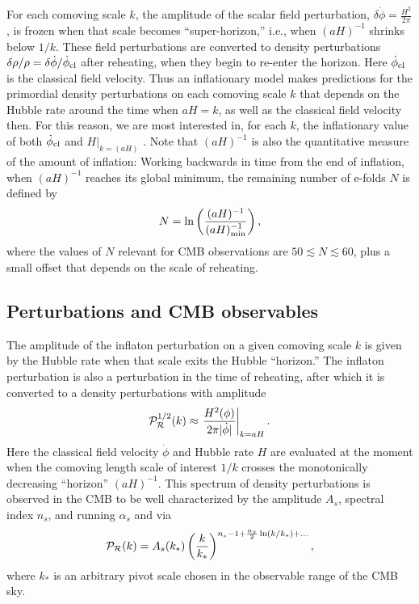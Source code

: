\documentclass[aps,amsfonts,amsmath,prd,preprint,nofootinbib,superscriptaddress]{revtex4}
\begin{document}
\begin{appendix}
For each comoving scale $k$, the amplitude of the scalar field perturbation, $\delta \dot\phi = \frac{H^2}{2\pi}$, is frozen when that scale becomes ``super-horizon,'' i.e., when
$(a H)^{-1}$ shrinks below $1/k$.  These field perturbations are converted to density perturbations $\delta \rho/\rho = \delta \dot\phi/\dot\phi_{\rm cl}$ after reheating, 
when they begin to re-enter the horizon.  Here   $\dot\phi_{\rm cl}$ is the classical field velocity.
Thus an inflationary model makes predictions for the primordial density perturbations on each comoving scale $k$ that depends on the Hubble rate around
the time when $a H = k$, as well as the classical field velocity then.  For this reason, we are most interested in, for each $k$, the inflationary value of both $\dot\phi_{\rm cl}$ and $\left.H\right|_{k=(aH)}$ .  
Note that $(a H)^{-1}$ is
also the quantitative measure of the amount of inflation:  Working backwards in time from the end of inflation, when $(aH)^{-1}$ reaches its global minimum, 
the remaining number of e-folds $N$ is defined by
\begin{align}
N = \ln\left(\frac{(a H)^{-1}}{(a H)^{-1}_{\rm min}}  \right),
\end{align}
where the values of $N$ relevant for CMB observations are $50 \lesssim N \lesssim 60$, plus a small offset that depends on the scale of reheating.


\subsection{Perturbations and CMB observables}
The amplitude of the inflaton perturbation on a given comoving scale $k$ is given by the Hubble rate when that
scale exits the Hubble ``horizon.''   The inflaton perturbation is also a perturbation in the time of reheating, after which it is converted to a density perturbations with
amplitude
\begin{align}
{\cal P}_{\cal R}^{1/2}(k) \approx \left.\frac{H^2(\phi)}{2\pi|\dot\phi|}\right|_{k = a H}.
\end{align}
Here the classical field velocity $\dot\phi$ and Hubble rate $H$ are evaluated at the moment when the comoving length scale of interest $1/k$ crosses the monotonically decreasing ``horizon'' $(aH)^{-1}$.
This spectrum of density perturbations is observed in the CMB to be well characterized by the amplitude $A_s$, spectral index $n_s$, and running $\alpha_s$ and via
\begin{align}
 {\cal P}_{\cal R}(k) = A_s(k_\ast)\left(\frac{k}{k_\ast}\right)^{n_s - 1 + \frac{\alpha_s}{2}\ln(k/k_\ast) + ...},
\end{align}
where $k_\ast$ is an arbitrary pivot scale chosen in the observable range of the CMB sky.


\end{appendix}
\end{document}
